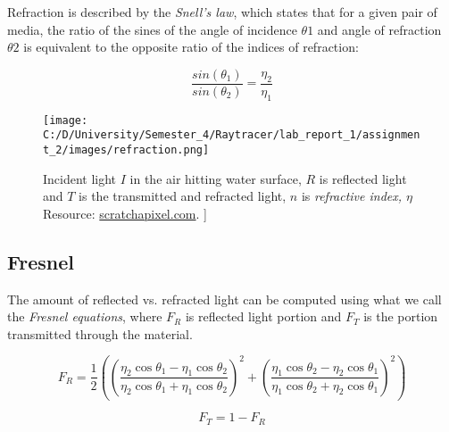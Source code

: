 \documentclass{article}
\begin{document}
	      Refraction is described by the \textit{Snell's law}, which states that for a given pair of media, the ratio of the sines of the angle of incidence $\theta1$ and angle of refraction $\theta2$ is equivalent to the opposite ratio of the indices of refraction: 
	      
	      \begin{equation}
\frac{sin(\theta_1)}{sin(\theta_2)} = \frac{\eta_2}{\eta_1} 
	      \end{equation}
      
	      
	\begin{figure}[H]
	\begin{center}
		\texttt{[image: C:/D/University/Semester\_4/Raytracer/lab\_report\_1/assignment\_2/images/refraction.png]}
		
		\caption{Incident light $I$ in the air hitting water surface, $R$ is reflected light and $T$ is the transmitted and refracted light, $n$ is \textit{refractive index, $\eta$  } Resource: \href{https://www.scratchapixel.com/images/upload/shading-intro/shad-refraction6.png?}{scratchapixel.com}.
			]}
	\end{center}
\end{figure}

\subsection{Fresnel}
The amount of reflected vs. refracted light can be computed using what we call the \textit{Fresnel equations}, where $F_R$ is reflected light portion and $F_T$ is the portion transmitted through the material. 

\begin{equation}
 F_R = \dfrac{1}{2}(\left( \dfrac{\eta_2 \cos\theta_1 - \eta_1 \cos \theta_2}{\eta_2 \cos\theta_1 + \eta_1 \cos \theta_2} \right)^2 + \left( \dfrac{\eta_1 \cos\theta_2 - \eta_2 \cos \theta_1}{\eta_1 \cos\theta_2 + \eta_2 \cos \theta_1} \right)^2)
\end{equation}



\begin{equation}
F_T= 1 - F_R 
\end{equation}
\end{document}
